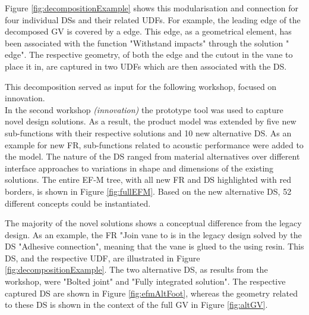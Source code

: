 \documentclass[aerospace,article,submit,moreauthors,pdftex]{Definitions/mdpi}
\newcommand{\revision}[1]{\color{black}{#1 }\color{black}}
\begin{document}

Figure \ref{fig:decompositionExample} shows this modularisation and connection for four individual \acp{DS} and their related \acp{UDF}.
For example, the leading edge of the decomposed \ac{GV} is covered by a \revision{metallic} edge.
This \revision{metallic}  edge, as a geometrical element, has been associated with the function "Withstand impacts" through the solution "\revision{Metallic}  edge".
The respective geometry, of both the \revision{metallic}  edge and the cutout in the vane to place it in, are captured in two \acp{UDF} which are then associated with the \ac{DS}.


This decomposition served as input for the following workshop, focused on innovation. 
\\



In the second workshop \textit{(innovation)} the prototype tool was used to capture novel design solutions.
As a result, the product model was extended by five new sub-functions with their respective solutions and 10 new alternative \ac{DS}.
As an example for new FR, sub-functions related to acoustic performance were added to the model. 
The nature of the \ac{DS} ranged from material alternatives over different interface approaches to variations in shape and dimensions of the existing solutions.
The entire EF-M tree, with all new FR and DS highlighted with red borders, is shown in Figure \ref{fig:fullEFM}.
Based on the new alternative DS, 52 different concepts could be instantiated.


The majority of the novel solutions shows a conceptual difference from the legacy design.
As an example, the \ac{FR} "Join vane to \revision{attachment"} is in the legacy design solved by the \ac{DS} "Adhesive connection", meaning that the vane is glued to the \revision{attachment} using resin.
This DS, and the respective UDF, are illustrated in Figure \ref{fig:decompositionExample}.
The two alternative \ac{DS}, as results from the workshop, were "Bolted joint" and "Fully integrated solution".
The respective captured DS are shown in Figure \ref{fig:efmAltFoot}, whereas the geometry related to these DS is shown in the context of the full GV in Figure \ref{fig:altGV}.
\end{document}
